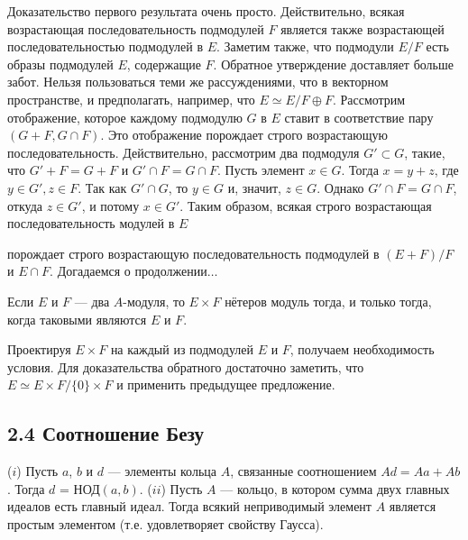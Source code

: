 \documentclass{../../template/mai_book}
\begin{document}
\begin{myproof}
Доказательство первого результата очень просто. Действительно, всякая возрастающая последовательность подмодулей $F$ является также возрастающей последовательностью подмодулей в $E$. Заметим также, что подмодули $E/F$ есть образы подмодулей $E$, содержащие $F$. \newline Обратное утверждение доставляет больше забот. Нельзя пользоваться теми же рассуждениями, что в векторном пространстве, и предполагать, например, что $E \simeq E/F \oplus F$. \newline Рассмотрим отображение, которое каждому подмодулю $G$ в $E$ ставит в соответствие пару $(G + F, G \cap F)$. Это отображение порождает строго возрастающую последовательность. Действительно, рассмотрим два подмодуля $G' \subset G$, такие, что $G' + F = G + F$ и $G' \cap F = G \cap F$. Пусть элемент $x \in G$. Тогда $x = y + z$, где $y \in G', z \in F$. Так как $G' \cap G$, то $y \in G$ и, значит, $z \in G$. Однако $G' \cap F = G \cap F$, откуда $z \in G'$, и потому $x \in G'$. Таким образом, всякая строго возрастающая последовательность модулей в $E$

\newpage
\noindent порождает строго возрастающую последовательность подмодулей в $(E + F)/F$ и $E \cap F$. Догадаемся о продолжении$\dots$
\end{myproof}

\begin{predl}
\textit{\indent} Если $E$ и $F$ — два $A$-модуля, то $E \times F$ нётеров модуль тогда, и только тогда, когда таковыми являются $E$ и $F$.
\end{predl}

\begin{myproof}
Проектируя $E \times F$ на каждый из подмодулей $E$ и $F$, получаем необходимость условия. Для доказательства обратного достаточно заметить, что $E \simeq E \times F / \{0\} \times F$ и применить предыдущее предложение.
\end{myproof}

\subsection{\large 2.4 Соотношение Безу}

\begin{predl}
\textit{\indent} ($i$) Пусть $a$, $b$ и $d$ — элементы кольца $A$, связанные соотношением \newline $Ad = Aa + Ab$. Тогда $d$ = НОД$(a, b)$. \newline \indent($ii$) Пусть $A$ — кольцо, в котором сумма двух главных идеалов есть главный идеал. Тогда всякий неприводимый элемент $A$ является простым элементом (т.е. удовлетворяет свойству Гаусса).
\end{predl}
\end{document}
